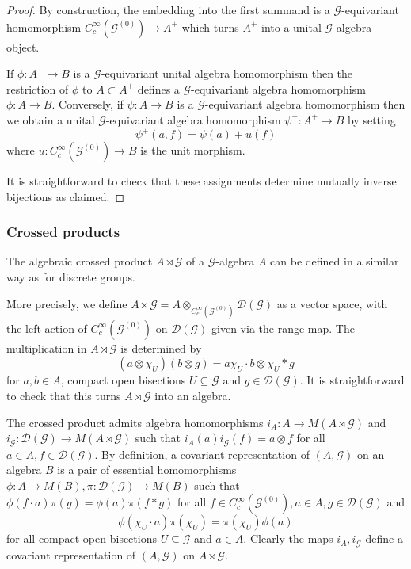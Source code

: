 \documentclass{amsart}
\newcommand{\G}{\mathcal{G}}
\newcommand{\DG}{\mathcal{D}(\mathcal{G})}
\newcommand{\ccinfty}{C_c^\infty}
\begin{document}
\begin{proof}
By construction, the embedding into the first summand is a $ \G $-equivariant homomorphism $ \ccinfty(\G^{(0)}) \rightarrow A^+ $ which turns $ A^+ $ into a unital $ \G $-algebra object. 

If $ \phi: A^+ \rightarrow B $ is a $ \G $-equivariant unital algebra homomorphism then the restriction of $ \phi $ to $ A \subset A^+ $ defines a $ \G $-equivariant algebra homomorphism $ \phi: A \rightarrow B $. Conversely, if $ \psi: A \rightarrow B $ is a $ \G $-equivariant algebra homomorphism then we obtain a unital $ \G $-equivariant algebra homomorphism $ \psi^+: A^+ \rightarrow B $ by setting 
$$
\psi^+(a, f) = \psi(a) + u(f) 
$$
where $ u: \ccinfty(\G^{(0)}) \rightarrow B $ is the unit morphism. 

It is straightforward to check that these assignments determine mutually inverse bijections as claimed. 
\end{proof}


\subsubsection{Crossed products} 

The algebraic crossed product $ A \rtimes \G $ of a $ \G $-algebra $ A $ can be defined in a similar way as for discrete groups. 

More precisely, we define $ A \rtimes \G = A \otimes_{\ccinfty(\G^{(0)})} \DG $ as a vector space, with the left action of $ \ccinfty(\G^{(0)}) $ on $ \DG $ given via the range map. The multiplication in $ A \rtimes \G $ is determined by 
$$
(a \otimes \chi_U)(b \otimes g) = a \chi_U \cdot b \otimes \chi_U * g 
$$
for $ a, b \in A $, compact open bisections $ U \subseteq \G $ and $ g \in \DG $. It is straightforward to check that this turns $ A \rtimes \G $ into an algebra. 

The crossed product admits algebra homomorphisms $ i_A: A \rightarrow M(A \rtimes \G) $ and $ i_\G: \DG \rightarrow M(A \rtimes \G) $ such that $ i_A(a) i_\G(f) = a \otimes f $ 
for all $ a \in A, f \in \DG $. 
By definition, a covariant representation of $ (A, \G) $ on an algebra $ B $ is a pair of essential homomorphisms $ \phi: A \rightarrow M(B), \pi: \DG \rightarrow M(B) $ such that $ \phi(f \cdot a) \pi(g) = \phi(a) \pi(f * g) $ for all $ f \in \ccinfty(\G^{(0)}), a \in A, g \in \DG $ and 
$$
\phi(\chi_U \cdot a) \pi(\chi_U) = \pi(\chi_U) \phi(a) 
$$
for all compact open bisections $ U \subseteq \G $ and $ a \in A $. Clearly the maps $ i_A, i_{\G} $ define a covariant representation of $ (A, \G) $ on $ A \rtimes \G $. 
\end{document}
